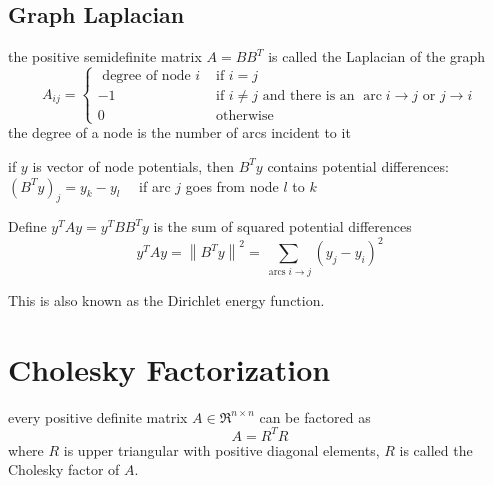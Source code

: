 \subsection{Graph Laplacian}

\begin{definition}
    the positive semidefinite matrix $ A=B B^{T} $ is called the Laplacian of the graph
\begin{equation}
A_{i j}=\left\{\begin{array}{ll}
\text { degree of node } i & \text { if } i=j \\
-1 & \text { if } i \neq j \text { and there is an } \operatorname{arc} i \rightarrow j \text { or } j \rightarrow i \\
0 & \text { otherwise }
\end{array}\right.
\end{equation}
the degree of a node is the number of arcs incident to it
\end{definition}

\begin{theorem}
    if $ y $ is vector of node potentials, then $ B^{T} y $ contains potential differences:
$ \left(B^{T} y\right)_{j}=y_{k}-y_{l} \quad $ if arc $ j $ goes from node $ l $ to $ k $
\end{theorem}

\begin{theorem}
    Define $ y^{T} A y=y^{T} B B^{T} y $ is the sum of squared potential differences
\begin{equation}
y^{T} A y=\left\|B^{T} y\right\|^{2}=\sum_{\operatorname{arcs} i \rightarrow j}\left(y_{j}-y_{i}\right)^{2}
\end{equation}

This is also known as the Dirichlet energy function.
\end{theorem}

\section{Cholesky Factorization}

\begin{theorem}
    every positive definite matrix $ A \in \mathfrak{R}^{n \times n} $ can be factored as
\begin{equation}
A=R^{T} R
\end{equation}
where $ R $ is upper triangular with positive diagonal elements, $ R $ is called the Cholesky factor of $ A $.
\end{theorem}

